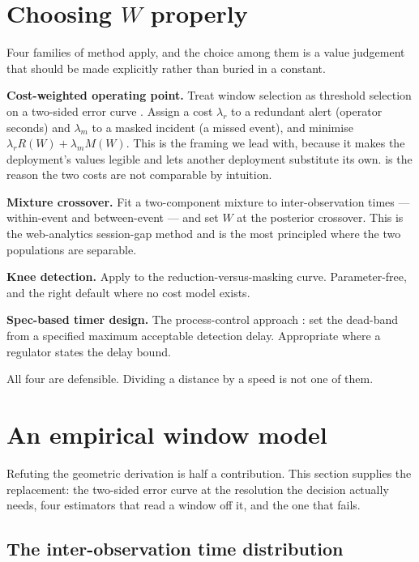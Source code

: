 \documentclass[11pt,a4paper]{article}
\begin{document}
\section{Choosing $W$ properly}
\label{sec:choose}

Four families of method apply, and the choice among them is a value judgement that
should be made explicitly rather than buried in a constant.

\textbf{Cost-weighted operating point.} Treat window selection as threshold
selection on a two-sided error curve \citep{fawcett2006roc}. Assign a cost
$\lambda_r$ to a redundant alert (operator seconds) and $\lambda_m$ to a masked
incident (a missed event), and minimise $\lambda_r R(W) + \lambda_m M(W)$. This is
the framing we lead with, because it makes the deployment's values legible and
lets another deployment substitute its own. \citet{axelsson2000baserate} is the
reason the two costs are not comparable by intuition.

\textbf{Mixture crossover.} Fit a two-component mixture to inter-observation times
--- within-event and between-event --- and set $W$ at the posterior crossover. This
is the web-analytics session-gap method \citep{catledge1995characterizing,
meiss2009session} and is the most principled where the two populations are
separable.

\textbf{Knee detection.} Apply \citet{satopaa2011kneedle} to the
reduction-versus-masking curve. Parameter-free, and the right default where no
cost model exists.

\textbf{Spec-based timer design.} The process-control approach
\citep{adnan2011detectiondelay, afzal2018timedeadbands, wang2022delaytimers}: set
the dead-band from a specified maximum acceptable detection delay. Appropriate
where a regulator states the delay bound.

All four are defensible. Dividing a distance by a speed is not one of them.

\section{An empirical window model}
\label{sec:empirical}

Refuting the geometric derivation is half a contribution. This section supplies
the replacement: the two-sided error curve at the resolution the decision
actually needs, four estimators that read a window off it, and the one that
fails.

\subsection{The inter-observation time distribution}
\end{document}
